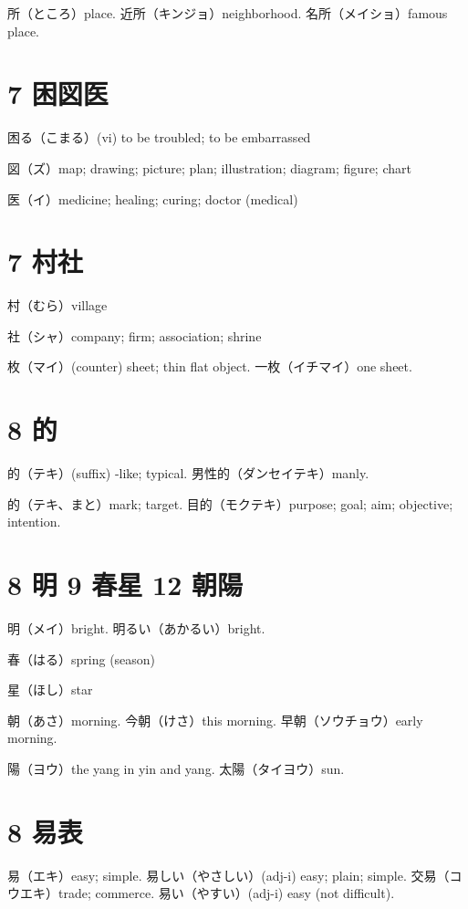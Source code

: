 所（ところ）place.
近所（キンジョ）neighborhood.
名所（メイショ）famous place.

\section{7 困図医}

困る（こまる）(vi) to be troubled; to be embarrassed

図（ズ）map; drawing; picture; plan; illustration; diagram; figure; chart

医（イ）medicine; healing; curing; doctor (medical)

\section{7 村社}

村（むら）village

社（シャ）company; firm; association; shrine

枚（マイ）(counter) sheet; thin flat object.
一枚（イチマイ）one sheet.

\section{8 的}

的（テキ）(suffix) -like; typical.
男性的（ダンセイテキ）manly.

的（テキ、まと）mark; target.
目的（モクテキ）purpose; goal; aim; objective; intention.

\section{8 明 9 春星 12 朝陽}

明（メイ）bright.
明るい（あかるい）bright.

春（はる）spring (season)

星（ほし）star

朝（あさ）morning.
今朝（けさ）this morning.
早朝（ソウチョウ）early morning.

陽（ヨウ）the yang in yin and yang.
太陽（タイヨウ）sun.

\section{8 易表}

易（エキ）easy; simple.
易しい（やさしい）(adj-i) easy; plain; simple.
交易（コウエキ）trade; commerce.
易い（やすい）(adj-i) easy (not difficult).

